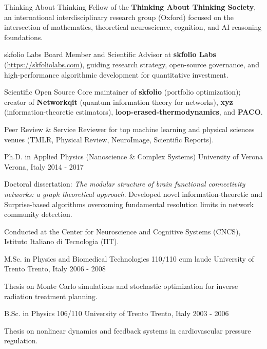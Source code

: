 \documentclass[11pt, a4paper]{awesome-cv}
\begin{document}



\begin{cvskills}

\cvskill
{Thinking About Thinking} {Fellow of the \textbf{Thinking About Thinking Society}, an international interdisciplinary research group (Oxford) focused on the intersection of mathematics, theoretical neuroscience, cognition, and AI reasoning foundations.}

\cvskill
{skfolio Labs} {Board Member and Scientific Advisor at \textbf{skfolio Labs} (\url{https://skfoliolabs.com}), guiding research strategy, open-source governance, and high-performance algorithmic development for quantitative investment.}

\cvskill
{Scientific Open Source} {Core maintainer of \textbf{skfolio} (portfolio optimization); creator of \textbf{Networkqit} (quantum information theory for networks), \textbf{xyz} (information-theoretic estimators), \textbf{loop-erased-thermodynamics}, and \textbf{PACO}.}

\cvskill
{Peer Review \& Service} {Reviewer for top machine learning and physical sciences venues (TMLR, Physical Review, NeuroImage, Scientific Reports).}

\end{cvskills}
 




\begin{cventries}

\cventry
{Ph.D. in Applied Physics (Nanoscience \& Complex Systems)} {University of Verona} {Verona, Italy} {2014 - 2017} { \begin{cvitems}
\item {Doctoral dissertation: \textit{The modular structure of brain functional connectivity networks: a graph theoretical approach}. Developed novel information-theoretic and Surprise-based algorithms overcoming fundamental resolution limits in network community detection.}
\item {Conducted at the Center for Neuroscience and Cognitive Systems (CNCS), Istituto Italiano di Tecnologia (IIT).}
\end{cvitems}
}

\cventry
{M.Sc. in Physics and Biomedical Technologies \textbar{} 110/110 cum laude} {University of Trento} {Trento, Italy} {2006 - 2008} { \begin{cvitems}
\item {Thesis on Monte Carlo simulations and stochastic optimization for inverse radiation treatment planning.}
\end{cvitems}
}

\cventry
{B.Sc. in Physics \textbar{} 106/110} {University of Trento} {Trento, Italy} {2003 - 2006} { \begin{cvitems}
\item {Thesis on nonlinear dynamics and feedback systems in cardiovascular pressure regulation.}
\end{cvitems}
}



\end{cventries} 
\end{document}
